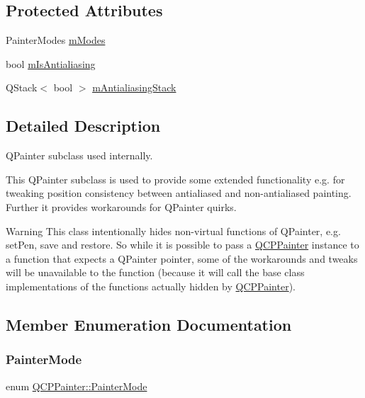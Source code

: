 \subsection*{Protected Attributes}
\begin{DoxyCompactItemize}
\item 
Painter\+Modes \hyperlink{class_q_c_p_painter_af5d1d6e5df0adbc7de5633250fb3396c}{m\+Modes}
\item 
bool \hyperlink{class_q_c_p_painter_a7055085da176aee0f6b23298f1003d08}{m\+Is\+Antialiasing}
\item 
Q\+Stack$<$ bool $>$ \hyperlink{class_q_c_p_painter_a0189e641bbf7dc31ac15aef7b36501fa}{m\+Antialiasing\+Stack}
\end{DoxyCompactItemize}


\subsection{Detailed Description}
Q\+Painter subclass used internally. 

This Q\+Painter subclass is used to provide some extended functionality e.\+g. for tweaking position consistency between antialiased and non-\/antialiased painting. Further it provides workarounds for Q\+Painter quirks.

\begin{DoxyWarning}{Warning}
This class intentionally hides non-\/virtual functions of Q\+Painter, e.\+g. set\+Pen, save and restore. So while it is possible to pass a \hyperlink{class_q_c_p_painter}{Q\+C\+P\+Painter} instance to a function that expects a Q\+Painter pointer, some of the workarounds and tweaks will be unavailable to the function (because it will call the base class implementations of the functions actually hidden by \hyperlink{class_q_c_p_painter}{Q\+C\+P\+Painter}). 
\end{DoxyWarning}


\subsection{Member Enumeration Documentation}
\mbox{\label{class_q_c_p_painter_a156cf16444ff5e0d81a73c615fdb156d}} 
\subsubsection{\texorpdfstring{Painter\+Mode}{PainterMode}}
{\footnotesize\ttfamily enum \hyperlink{class_q_c_p_painter_a156cf16444ff5e0d81a73c615fdb156d}{Q\+C\+P\+Painter\+::\+Painter\+Mode}}

